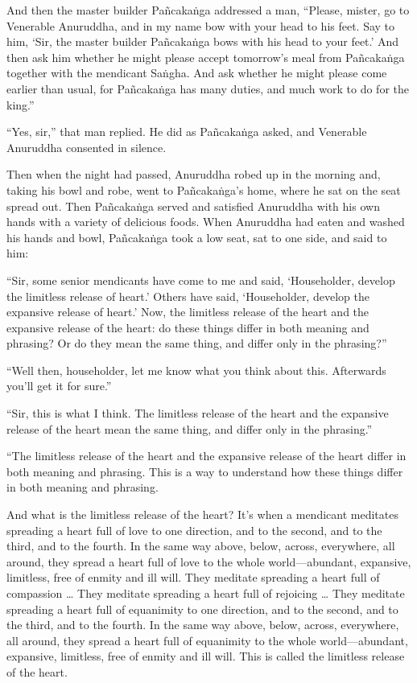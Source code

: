 \documentclass[12pt,openany]{book}%
\begin{document}
And then the master builder \textsanskrit{Pañcakaṅga} addressed a man, “Please, mister, go to Venerable Anuruddha, and in my name bow with your head to his feet. Say to him, ‘Sir, the master builder \textsanskrit{Pañcakaṅga} bows with his head to your feet.’ And then ask him whether he might please accept tomorrow’s meal from \textsanskrit{Pañcakaṅga} together with the mendicant \textsanskrit{Saṅgha}. And ask whether he might please come earlier than usual, for \textsanskrit{Pañcakaṅga} has many duties, and much work to do for the king.” 

“Yes, sir,” that man replied. He did as \textsanskrit{Pañcakaṅga} asked, and Venerable Anuruddha consented in silence. 

Then when the night had passed, Anuruddha robed up in the morning and, taking his bowl and robe, went to \textsanskrit{Pañcakaṅga}’s home, where he sat on the seat spread out. Then \textsanskrit{Pañcakaṅga} served and satisfied Anuruddha with his own hands with a variety of delicious foods. When Anuruddha had eaten and washed his hands and bowl, \textsanskrit{Pañcakaṅga} took a low seat, sat to one side, and said to him: 

“Sir, some senior mendicants have come to me and said, ‘Householder, develop the limitless release of heart.’ Others have said, ‘Householder, develop the expansive release of heart.’ Now, the limitless release of the heart and the expansive release of the heart: do these things differ in both meaning and phrasing? Or do they mean the same thing, and differ only in the phrasing?” 

“Well then, householder, let me know what you think about this. Afterwards you’ll get it for sure.” 

“Sir, this is what I think. The limitless release of the heart and the expansive release of the heart mean the same thing, and differ only in the phrasing.” 

“The limitless release of the heart and the expansive release of the heart differ in both meaning and phrasing. This is a way to understand how these things differ in both meaning and phrasing. 

And what is the limitless release of the heart? It’s when a mendicant meditates spreading a heart full of love to one direction, and to the second, and to the third, and to the fourth. In the same way above, below, across, everywhere, all around, they spread a heart full of love to the whole world—abundant, expansive, limitless, free of enmity and ill will. They meditate spreading a heart full of compassion … They meditate spreading a heart full of rejoicing … They meditate spreading a heart full of equanimity to one direction, and to the second, and to the third, and to the fourth. In the same way above, below, across, everywhere, all around, they spread a heart full of equanimity to the whole world—abundant, expansive, limitless, free of enmity and ill will. This is called the limitless release of the heart. 
\end{document}
